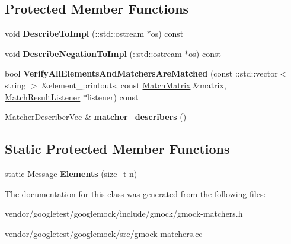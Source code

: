\subsection*{Protected Member Functions}
\begin{DoxyCompactItemize}
\item 
\mbox{\label{classtesting_1_1internal_1_1_unordered_elements_are_matcher_impl_base_a40318adf9a89d830a26a96b2eb06b4e3}} 
void {\bfseries Describe\+To\+Impl} (\+::std\+::ostream $\ast$os) const
\item 
\mbox{\label{classtesting_1_1internal_1_1_unordered_elements_are_matcher_impl_base_ab3ca5ae4aef146b093a3fb35f53d1a38}} 
void {\bfseries Describe\+Negation\+To\+Impl} (\+::std\+::ostream $\ast$os) const
\item 
\mbox{\label{classtesting_1_1internal_1_1_unordered_elements_are_matcher_impl_base_a515ec900bd84fe4d28e3ccf55db25822}} 
bool {\bfseries Verify\+All\+Elements\+And\+Matchers\+Are\+Matched} (const \+::std\+::vector$<$ string $>$ \&element\+\_\+printouts, const \mbox{\hyperlink{classtesting_1_1internal_1_1_match_matrix}{Match\+Matrix}} \&matrix, \mbox{\hyperlink{classtesting_1_1_match_result_listener}{Match\+Result\+Listener}} $\ast$listener) const
\item 
\mbox{\label{classtesting_1_1internal_1_1_unordered_elements_are_matcher_impl_base_a04d4adc809d9c06331f8dbb67b879ac0}} 
Matcher\+Describer\+Vec \& {\bfseries matcher\+\_\+describers} ()
\end{DoxyCompactItemize}
\subsection*{Static Protected Member Functions}
\begin{DoxyCompactItemize}
\item 
\mbox{\label{classtesting_1_1internal_1_1_unordered_elements_are_matcher_impl_base_ab6d5a2342e07730b913f419cf662d16a}} 
static \mbox{\hyperlink{classtesting_1_1_message}{Message}} {\bfseries Elements} (size\+\_\+t n)
\end{DoxyCompactItemize}


The documentation for this class was generated from the following files\+:\begin{DoxyCompactItemize}
\item 
vendor/googletest/googlemock/include/gmock/gmock-\/matchers.\+h\item 
vendor/googletest/googlemock/src/gmock-\/matchers.\+cc\end{DoxyCompactItemize}
